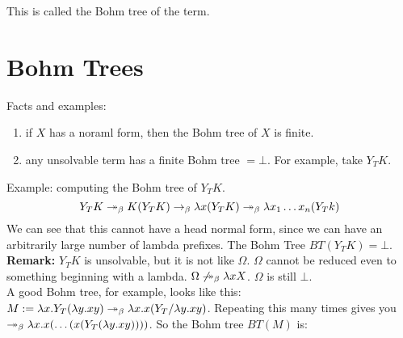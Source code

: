 This is called the Bohm tree of the term.

\section{Bohm Trees}
Facts and examples:
\begin{enumerate}[(1)]
  \item if $X$ has a noraml form, then the Bohm tree of $X$ is finite.
  \item any unsolvable term has a finite Bohm tree $= \bot$. For example, take $Y_TK$.
\end{enumerate}
Example: computing the Bohm tree of $Y_TK$.\\
\begin{equation*}
  Y_TK \twoheadrightarrow_\beta K(Y_TK) \rightarrow_\beta \lambda x(Y_TK) \twoheadrightarrow_\beta \lambda x_1\ldots x_n(Y_Tk)
\end{equation*}
We can see that this cannot have a head normal form, since we can have an arbitrarily large number of lambda prefixes. The Bohm Tree $BT(Y_TK) = \bot$.\\

\textbf{Remark:} $Y_TK$ is unsolvable, but it is not like $\Omega$. $\Omega$ cannot be reduced even to something beginning with a lambda. $\Omega \not\twoheadrightarrow_\beta \lambda xX$. $\Omega$ is still $\bot$.\\

A good Bohm tree, for example, looks like this: $M := \lambda x.Y_T(\lambda y.xy) \twoheadrightarrow_\beta \lambda x.x(Y_T/\lambda y.xy)$. Repeating this many times gives you $\twoheadrightarrow_\beta \lambda x.x(\ldots(x(Y_T(\lambda y.xy))))$. So the Bohm tree $BT(M)$ is:
